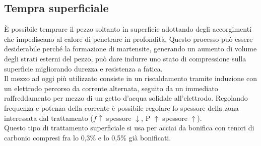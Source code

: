 \subsection{Tempra superficiale}
È possibile temprare il pezzo soltanto in superficie adottando degli accorgimenti che impediscano al calore di penetrare in profondità. Questo processo può essere desiderabile perché la formazione di martensite, generando un aumento di volume degli strati esterni del pezzo, può dare indurre uno stato di compressione sulla superficie migliorando durezza e resistenza a fatica.\\
Il mezzo ad oggi più utilizzato consiste in un riscaldamento tramite induzione con un elettrodo percorso da corrente alternata, seguito da un immediato raffreddamento per mezzo di un getto d'acqua solidale all'elettrodo. Regolando frequenza e potenza della corrente è possibile regolare lo spessore della zona interessata dal trattamento ($f\uparrow$ spessore $\downarrow$, P $\uparrow$ spessore $\uparrow$).\\
Questo tipo di trattamento superficiale si usa per acciai da bonifica con tenori di carbonio compresi fra lo 0,3\% e lo 0,5\% già bonificati.